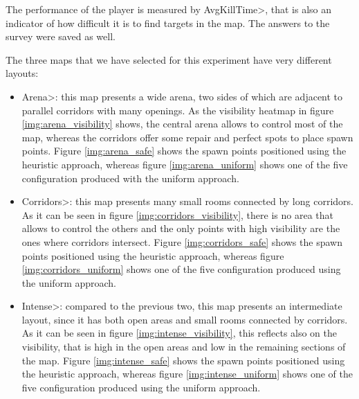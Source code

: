 \noindent
The performance of the player is measured by \<AvgKillTime>, that is also an indicator of how difficult it is to find targets in the map. The answers to the survey were saved as well.

\par

The three maps that we have selected for this experiment have very different layouts:

\begin{itemize}
\item \<Arena>: this map presents a wide arena, two sides of which are adjacent to parallel corridors with many openings. As the visibility heatmap in figure \ref{img:arena_visibility} shows, the central arena allows to control most of the map, whereas the corridors offer some repair and perfect spots to place spawn points. Figure \ref{img:arena_safe} shows the spawn points positioned using the heuristic approach, whereas figure \ref{img:arena_uniform} shows one of the five configuration produced with the uniform approach.
\item \<Corridors>: this map presents many small rooms connected by long corridors. As it can be seen in figure \ref{img:corridors_visibility}, there is no area that allows to control the others and the only points with high visibility are the ones where corridors intersect. Figure \ref{img:corridors_safe} shows the spawn points positioned using the heuristic approach, whereas figure \ref{img:corridors_uniform} shows one of the five configuration produced using the uniform approach.
\item \<Intense>: compared to the previous two, this map presents an intermediate layout, since it has both open areas and small rooms connected by corridors. As it can be seen in figure \ref{img:intense_visibility}, this reflects also on the visibility, that is high in the open areas and low in the remaining sections of the map. Figure \ref{img:intense_safe} shows the spawn points positioned using the heuristic approach, whereas figure \ref{img:intense_uniform} shows one of the five configuration produced using the uniform approach.
\end{itemize}


